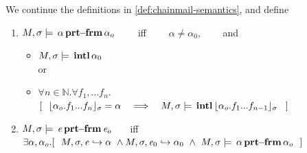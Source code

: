 
\begin{definition} 
\label{def:chainmail-protection-from}
\label{sect:semantics:assert:prtFrom}
We continue the definitions in \ref{def:chainmail-semantics}, and define   
\begin{enumerate}
\item
\label{cProtected}
 $M , \sigma \models {\ensuremath{\, {\alpha}\, \mathbf{prt\!\!-\!\!frm}}\, {\alpha_{o}}}$  \ \ \ \ iff  \ \ \ \ 
 $\alpha\neq \alpha_0$,
 \ \ \ \  and
  \begin{itemize}
 \item
 $M , \sigma \models {\ensuremath{\, \mathbf{intl}}\, \alpha_0\, }$
 \\
 or
 \item
$\forall n\in\mathbb{N}. \forall f_1,...f_n.$
$
[\ \ \interpret{\sigma}{\alpha_{o}.f_1...f_n}=\alpha \ \ \  \Longrightarrow \ \ \ \satisfiesA{M} {\sigma} {\internal{{\interpret{\sigma}{\alpha_{o}.f_1...f_{n-1}}}}}\ \ ]$
\end{itemize}
\item
$M , \sigma \models {\ensuremath{\, {\mathit{e}}\, \mathbf{prt\!\!-\!\!frm}}\, {\mathit{e}_{o}}}$  \ \ \ iff \\
  $\exists \alpha, \alpha_{o}. [\  \ \eval{M}{\sigma}{{\re}}{\alpha}\ \wedge \eval{M}{\sigma}{{\re_0}}{\alpha_0} \  \wedge \ 
  \satisfiesA{M}{\sigma}{\protectedFrom{{\alpha}} {{\alpha_{o}}}}
 \ \  ]$
 \end{enumerate}
 \end{definition} 
 
